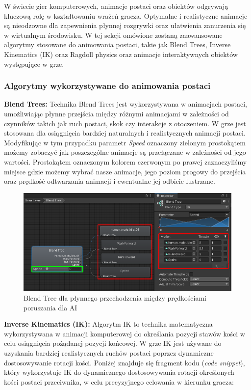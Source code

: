 W świecie gier komputerowych, animacje postaci oraz obiektów odgrywają kluczową rolę w kształtowaniu wrażeń gracza. Optymalne i realistyczne animacje są nieodzowne dla zapewnienia płynnej rozgrywki oraz ułatwienia zanurzenia się w wirtualnym środowisku. W tej sekcji omówione zostaną zaawansowane algorytmy stosowane do animowania postaci, takie jak Blend Trees, Inverse Kinematics (IK) oraz Ragdoll physics oraz animacje interaktywnych obiektów występujące w grze.


\subsubsection{Algorytmy wykorzystywane do animowania postaci}

\textbf{Blend Trees:} Technika Blend Trees jest wykorzystywana w animacjach postaci, umożliwiając płynne przejścia między różnymi animacjami w zależności od czynników takich jak ruch postaci, skok czy interakcje z otoczeniem. W grze jest stosowana dla osiągnięcia bardziej naturalnych i realistycznych animacji postaci. Modyfikując w tym przypadku parametr \textit{Speed} oznaczony zielonym prostokątem możemy zobaczyć jak poszczególne animacje są przełączane w zależności od jego wartości. Prostokątem oznaczonym kolorem czerwonym po prawej zaznaczyliśmy miejsce gdzie możemy wybrać nasze animacje, jego poziom progowy do przejścia oraz prędkość odtwarzania animacji i ewentualne jej odbicie lustrzane.\\
\begin{figure}[h]
    \centering
    \includegraphics[width=1\linewidth]{Images/blendTree.png}
    \caption{Blend Tree dla płynnego przechodzenia między prędkościami poruszania dla AI}
\end{figure}
\FloatBarrier
\textbf{Inverse Kinematics (IK):}  Algorytm IK to technika matematyczna wykorzystywana w animacji komputerowej do określania pozycji stawów kości w celu osiągnięcia pożądanej pozycji końcowej. W grze IK jest używane do uzyskania bardziej realistycznych ruchów postaci poprzez dynamiczne dostosowywanie rotacji kości. Poniżej znajduje się fragment kodu (\textit{code snippet}), który wykorzystuje IK do dynamicznego dostosowywania rotacji określonych kości postaci przeciwnika, w celu precyzyjnego celowania w kierunku gracza:
